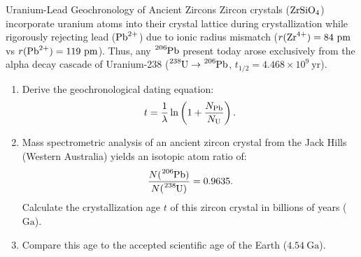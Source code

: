 \begin{exercise}{Uranium-Lead Geochronology of Ancient Zircons}
Zircon crystals ($\ce{ZrSiO4}$) incorporate uranium atoms into their crystal lattice during crystallization while rigorously rejecting lead ($\ce{Pb^{2+}}$) due to ionic radius mismatch ($r(\ce{Zr^{4+}}) = 84\ \mathrm{pm}$ vs $r(\ce{Pb^{2+}}) = 119\ \mathrm{pm}$). Thus, any $\ce{^{206}Pb}$ present today arose exclusively from the alpha decay cascade of Uranium-238 ($\ce{^{238}U} \to \ce{^{206}Pb}$, $t_{1/2} = 4.468 \times 10^9\ \mathrm{yr}$).
\begin{enumerate}[leftmargin=1.5em,itemsep=2pt]
  \item Derive the geochronological dating equation:
  \[
  t = \frac{1}{\lambda} \ln \left( 1 + \frac{N_{\ce{Pb}}}{N_{\ce{U}}} \right).
  \]
  \item Mass spectrometric analysis of an ancient zircon crystal from the Jack Hills (Western Australia) yields an isotopic atom ratio of:
  \[
  \frac{N(\ce{^{206}Pb})}{N(\ce{^{238}U})} = 0.9635.
  \]
  Calculate the crystallization age $t$ of this zircon crystal in billions of years ($\mathrm{Ga}$).
  \item Compare this age to the accepted scientific age of the Earth ($4.54\ \mathrm{Ga}$).
\end{enumerate}
\end{exercise}

\begin{tabletworkspace}[5.0cm]
\end{tabletworkspace}

